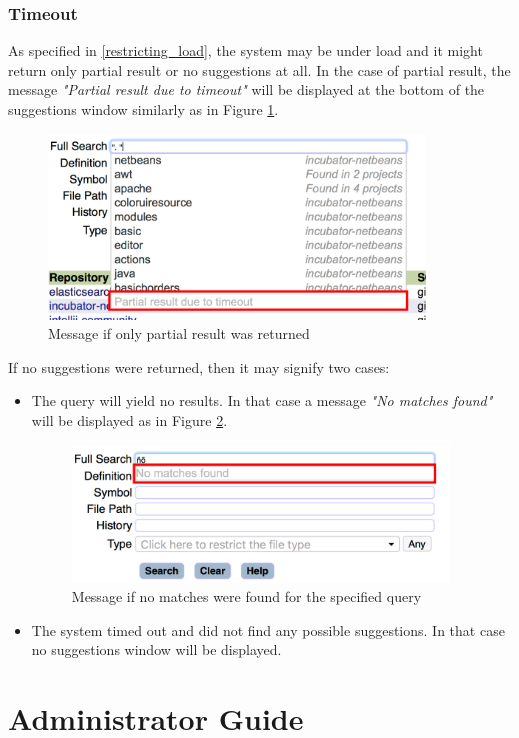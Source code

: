 \subsubsection{Timeout}
As specified in \ref{restricting_load}, the system may be under load and it might return only partial result or no
suggestions at all. In the case of partial result, the message \textit{"Partial result due to timeout"} will be
displayed at the bottom of the suggestions window similarly as in Figure \ref{partial_result}.
\begin{figure}[htbp]
    \centering
    \includegraphics[width=100mm]{../img/partial_result.png}
    \caption{Message if only partial result was returned}
    \label{partial_result}
\end{figure}
If no suggestions were returned, then
it may signify two cases:
\begin{itemize}
    \item The query will yield no results. In that case a message \textit{"No matches found"} will be displayed as in
    Figure \ref{no_matches}.
    \begin{figure}[htbp]
        \centering
        \includegraphics[width=100mm]{../img/no_matches.png}
        \caption{Message if no matches were found for the specified query}
        \label{no_matches}
    \end{figure}

    \item The system timed out and did not find any possible suggestions. In that case no suggestions window will be displayed.
\end{itemize}

\section{Administrator Guide}
\label{administrator_guide}

